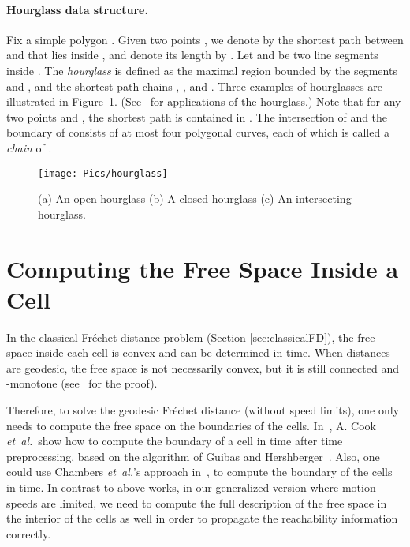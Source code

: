 \documentclass[12pt]{dalthesis}
\newcommand{\etal}{{\em et~al.\/}}
\newcommand{\REM}[1]{}
\newcommand{\Frechet}{Fr\'echet }
\begin{document}
\paragraph{Hourglass data structure.}
Fix a simple polygon .
Given two points , 
we denote by  the shortest path 
between  and  that lies inside ,
and denote its length by  .
Let  and  
be two 
line segments inside .
The \emph{hourglass} 
is defined as the maximal region bounded by 
the segments  and , 
and the shortest path chains , ,  and .
Three examples of hourglasses are illustrated in Figure~\ref{fig:OpenH}.
(See~\cite{Guibas86} for applications of the hourglass.)
Note that for any two points  and ,
the shortest path  is contained in .
The intersection of  and the boundary of 
consists of at most four polygonal curves,
each of which is called a \emph{chain} of .



\begin{figure}[h]
	\centering
	\texttt{[image: Pics/hourglass]}
	\caption{ (a) An open hourglass (b) A closed hourglass (c) An intersecting hourglass.
	}
	\label{fig:OpenH}
\end{figure}

\REM{
If  and 
are disjoint, the hourglass is called open, otherwise it is called closed. If  and  are crossing,
 is defined as the region bounded by 
, ,  and .
}




\newcommand{\Sub}{{\sigma}}

\section{Computing the Free Space Inside a Cell} 
\label{sec:ComputingFreeSpace}

In the classical \Frechet distance problem
(Section \ref{sec:classicalFD}),
the free space inside each cell 
is convex and can be determined in  time. 
When distances are geodesic, 
the free space is not necessarily convex,
but it is still connected and -monotone 
(see~\cite{WenkC08a} for the proof).



Therefore, to solve the geodesic \Frechet distance (without speed limits),
one only needs to compute the free space on the boundaries of the cells.
In~\cite{WenkC08a}, A. Cook \etal ~show how to compute  
the boundary of a cell in  time after
 time preprocessing, 
based on the algorithm of Guibas and Hershberger~\cite{Guibas86}.  
Also, one could use Chambers \etal's approach in~\cite{Chambers10}, 
to compute the boundary of the cells in  time.
In contrast to above works, in our generalized version where motion speeds are limited,
we need to compute the full description of the free space in the
interior of the cells as well in order to propagate the reachability 
information correctly. 
\end{document}
